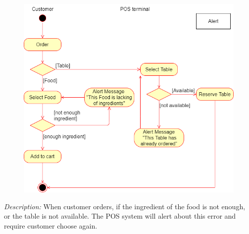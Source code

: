\documentclass[11pt]{article}
\begin{document}
            \begin{figure}[!h]
                \centering
                \includegraphics[scale=0.45]{Activity diagram/Alert.png}
            \end{figure}
            \textit{Description: }When customer orders, if the ingredient of the food is not enough, or the table is not available. The POS system will alert about this error and require customer choose again.
    \cleardoublepage
\end{document}
